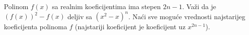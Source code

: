\problem{}
Polinom $f(x)$ sa realnim koeficijentima ima stepen $2n-1$.
Važi da je ${(f(x))^2-f(x)}$ deljiv sa ${(x^2-x)^n}$.
Naći sve moguće vrednosti najstarijeg koeficijenta polinoma $f$ (najstariji koeficijent je koeficijent uz $x^{2n-1}$). 
\solution
\endproblem
